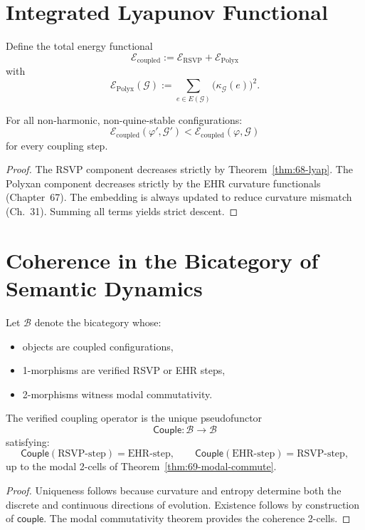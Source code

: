 \section{Integrated Lyapunov Functional}

Define the total energy functional
\[
\mathcal{E}_{\mathrm{coupled}}
  := \mathcal{E}_{\mathrm{RSVP}} + \mathcal{E}_{\mathrm{Polyx}}
\]
with
\[
\mathcal{E}_{\mathrm{Polyx}}(\mathcal{G})
  := \sum_{e\in E(\mathcal{G})}
     \bigl(\kappa_{\mathcal{G}}(e)\bigr)^2.
\]

\begin{theorem}
For all non-harmonic, non-quine-stable configurations:
\[
\mathcal{E}_{\mathrm{coupled}}(\varphi',\mathcal{G}')
  < \mathcal{E}_{\mathrm{coupled}}(\varphi,\mathcal{G})
\]
for every coupling step.
\end{theorem}

\begin{proof}
The RSVP component decreases strictly by 
Theorem~\ref{thm:68-lyap}.
The Polyxan component decreases strictly by the EHR curvature functionals 
(Chapter~67).
The embedding is always updated to reduce curvature mismatch (Ch.~31).
Summing all terms yields strict descent.
\end{proof}

\section{Coherence in the Bicategory of Semantic Dynamics}

Let $\mathcal{B}$ denote the bicategory whose:
\begin{itemize}
\item objects are coupled configurations,
\item 1-morphisms are verified RSVP or EHR steps,
\item 2-morphisms witness modal commutativity.
\end{itemize}

\begin{theorem}
\label{thm:69-bicat}
The verified coupling operator is the unique pseudofunctor
\[
\mathsf{Couple} : \mathcal{B} \to \mathcal{B}
\]
satisfying:
\[
\mathsf{Couple}(\text{RSVP-step})
  = \text{EHR-step},
\qquad
\mathsf{Couple}(\text{EHR-step})
  = \text{RSVP-step},
\]
up to the modal 2-cells of Theorem~\ref{thm:69-modal-commute}.
\end{theorem}

\begin{proof}
Uniqueness follows because curvature and entropy determine both 
the discrete and continuous directions of evolution.  
Existence follows by construction of $\mathsf{couple}$.  
The modal commutativity theorem provides the coherence 2-cells.
\end{proof}

